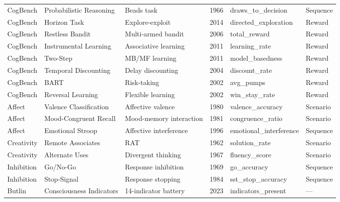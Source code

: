 \documentclass[10pt,landscape]{article}
\begin{document}
\begin{longtable}{@{}p{2.3cm}p{3.0cm}p{4.5cm}p{0.6cm}p{3.8cm}p{1.8cm}@{}}
\midrule
CogBench & Probabilistic Reasoning & Beads task & 1966 & draws\_to\_decision & Sequence \\
CogBench & Horizon Task & Explore-exploit & 2014 & directed\_exploration & Reward \\
CogBench & Restless Bandit & Multi-armed bandit & 2006 & total\_reward & Reward \\
CogBench & Instrumental Learning & Associative learning & 2011 & learning\_rate & Reward \\
CogBench & Two-Step & MB/MF learning \citep{daw2011model} & 2011 & model\_basedness & Reward \\
CogBench & Temporal Discounting & Delay discounting & 2004 & discount\_rate & Reward \\
CogBench & BART & Risk-taking \citep{lejuez2002evaluation} & 2002 & avg\_pumps & Reward \\
CogBench & Reversal Learning & Flexible learning \citep{cools2002reversal} & 2002 & win\_stay\_rate & Reward \\

\midrule
Affect & Valence Classification & Affective valence & 1980 & valence\_accuracy & Scenario \\
Affect & Mood-Congruent Recall & Mood-memory interaction \citep{bower1981mood} & 1981 & congruence\_ratio & Scenario \\
Affect & Emotional Stroop & Affective interference \citep{williams1996emotional} & 1996 & emotional\_interference & Sequence \\

\midrule
Creativity & Remote Associates & RAT \citep{mednick1962associative} & 1962 & solution\_rate & Scenario \\
Creativity & Alternate Uses & Divergent thinking & 1967 & fluency\_score & Scenario \\

\midrule
Inhibition & Go/No-Go & Response inhibition & 1969 & go\_accuracy & Sequence \\
Inhibition & Stop-Signal & Response stopping \citep{logan1984ability} & 1984 & sst\_stop\_accuracy & Sequence \\

\midrule
Butlin & Consciousness Indicators & 14-indicator battery \citep{butlin2023consciousness} & 2023 & indicators\_present & --- \\


\end{longtable}
\end{document}
